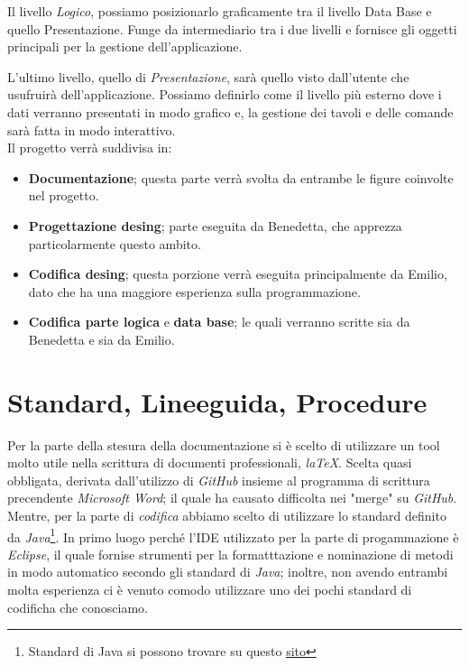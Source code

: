 \documentclass{book}
\begin{document}
Il livello \textit{Logico}, possiamo posizionarlo graficamente tra il livello Data Base e quello Presentazione. Funge da intermediario tra i due livelli e fornisce gli oggetti principali per la gestione dell'applicazione.

L'ultimo livello, quello di \textit{Presentazione}, sarà quello visto dall'utente che usufruirà dell'applicazione. Possiamo definirlo come il livello più esterno dove i dati verranno presentati in modo grafico e, la gestione dei tavoli e delle comande sarà fatta in modo interattivo.\\

Il progetto verrà suddivisa in:
\begin{itemize}
    \item \textbf{Documentazione}; questa parte verrà svolta da entrambe le figure coinvolte nel progetto. 
    \item \textbf{Progettazione desing}; parte eseguita da Benedetta, che apprezza particolarmente questo ambito.
    \item \textbf{Codifica desing}; questa porzione verrà eseguita principalmente da Emilio, dato che ha una maggiore esperienza sulla programmazione.
    \item \textbf{Codifica parte logica} e \textbf{data base}; le quali verranno scritte sia da Benedetta e sia da Emilio.
\end{itemize}

\section{Standard, Lineeguida, Procedure}

Per la parte della stesura della documentazione si è scelto di utilizzare un tool molto utile nella scrittura di documenti professionali, \textit{laTeX}. Scelta quasi obbligata, derivata dall'utilizzo di \textit{GitHub} insieme al programma di scrittura precendente \textit{Microsoft Word}; il quale ha causato difficolta nei "merge" su \textit{GitHub}.\\

Mentre, per la parte di \textit{codifica} abbiamo scelto di utilizzare lo standard definito da \textit{Java}\footnote{Standard di Java si possono trovare su questo \href{https://www.oracle.com/java/technologies/javase/codeconventions-contents.html}{\underline{sito}}}. In primo luogo perché l'IDE utilizzato per la parte di progammazione è \textit{Eclipse}, il quale fornise strumenti per la formatttazione e nominazione di metodi in modo automatico secondo gli standard di \textit{Java}; inoltre, non avendo entrambi molta esperienza ci è venuto comodo utilizzare uno dei pochi standard di codificha che conosciamo.\\
\end{document}
